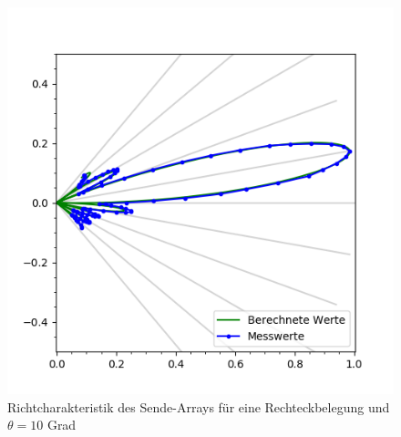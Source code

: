 \begin{figure}[htb]
\begin{minipage}{0.5\textwidth}
\includegraphics[width=\textwidth]{graphics/plot_test_characteristic_aperture_0_polar.png}
\caption{Richtcharakteristik des Sende-Arrays für eine Rechteckbelegung und $\theta = 10$ Grad} %
\label{fig:plot_test_characteristic_aperture_0_polar}
%
\end{minipage}
\begin{minipage}{0.5\textwidth}

\end{minipage}
\end{figure}
